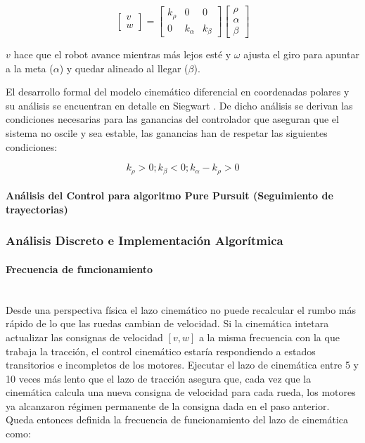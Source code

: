 \begin{equation*}	
	\begin{bmatrix}
		v \\
		w 
	\end{bmatrix}
	=
	\begin{bmatrix}
		k_{\rho} & 0 & 0 \\
		0 & k_{\alpha} & k_{\beta}
	\end{bmatrix}
	\begin{bmatrix}
		\rho \\
		\alpha \\
		\beta
	\end{bmatrix}
\end{equation*}


$v$ hace que el robot avance mientras más lejos esté y $\omega$ ajusta el giro para apuntar a la meta ($\alpha$) y quedar alineado al llegar ($\beta$).

El desarrollo formal del modelo cinemático diferencial en coordenadas polares y su análisis se encuentran en detalle en Siegwart \cite{siegwart2011}. De dicho análisis se derivan las condiciones necesarias para las ganancias del controlador que aseguran que el sistema no oscile y sea estable, las ganancias han de respetar las siguientes condiciones:

\begin{equation*}
	k_{\rho}>0  ;  k_{\beta}<0  ;  k_{\alpha}-k_{\rho}>0
\end{equation*}



\paragraph{Análisis del Control para algoritmo Pure Pursuit (Seguimiento de trayectorias)}

\subsubsection{Análisis Discreto e Implementación Algorítmica}


\paragraph{Frecuencia de funcionamiento}~\\

Desde una perspectiva física el lazo cinemático no puede recalcular el rumbo más rápido de lo que las ruedas cambian de velocidad. Si la cinemática intetara actualizar las consignas de velocidad $[v,w]$ a la misma frecuencia con la que trabaja la tracción, el control cinemático estaría respondiendo a estados transitorios e incompletos de los motores. Ejecutar el lazo de cinemática entre 5 y 10 veces más lento que el lazo de tracción asegura que, cada vez que la cinemática calcula una nueva consigna de velocidad para cada rueda, los motores ya alcanzaron régimen permanente de la consigna dada en el paso anterior.
Queda entonces definida la frecuencia de funcionamiento del lazo de cinemática como:

